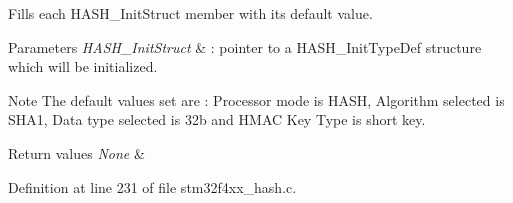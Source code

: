 Fills each H\-A\-S\-H\-\_\-\-Init\-Struct member with its default value. 


\begin{DoxyParams}{Parameters}
{\em H\-A\-S\-H\-\_\-\-Init\-Struct} & \-: pointer to a H\-A\-S\-H\-\_\-\-Init\-Type\-Def structure which will be initialized. \\
\hline
\end{DoxyParams}
\begin{DoxyNote}{Note}
The default values set are \-: Processor mode is H\-A\-S\-H, Algorithm selected is S\-H\-A1, Data type selected is 32b and H\-M\-A\-C Key Type is short key. 
\end{DoxyNote}

\begin{DoxyRetVals}{Return values}
{\em None} & \\
\hline
\end{DoxyRetVals}


Definition at line 231 of file stm32f4xx\-\_\-hash.\-c.

